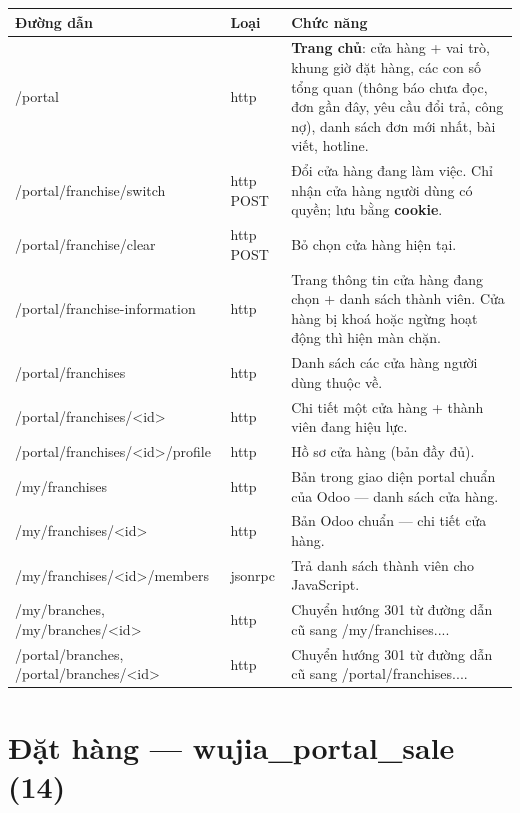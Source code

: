 \documentclass[11pt,a4paper]{report}
\newcommand{\rt}[1]{{\ttfamily\footnotesize #1}}
\begin{document}
{\small
\begin{longtable}{@{}L{5.4cm}L{1.5cm}L{7.5cm}@{}}
\toprule
\textbf{Đường dẫn} & \textbf{Loại} & \textbf{Chức năng} \\
\midrule
\endhead
\rt{/portal} & http & \textbf{Trang chủ}: cửa hàng + vai trò, khung giờ đặt hàng, các con số tổng quan (thông báo chưa đọc, đơn gần đây, yêu cầu đổi trả, công nợ), danh sách đơn mới nhất, bài viết, hotline. \\
\rt{/portal/franchise/switch} & http POST & Đổi cửa hàng đang làm việc. Chỉ nhận cửa hàng người dùng có quyền; lưu bằng \textbf{cookie}. \\
\rt{/portal/franchise/clear} & http POST & Bỏ chọn cửa hàng hiện tại. \\
\rt{/portal/franchise-information} & http & Trang thông tin cửa hàng đang chọn + danh sách thành viên. Cửa hàng bị khoá hoặc ngừng hoạt động thì hiện màn chặn. \\
\rt{/portal/franchises} & http & Danh sách các cửa hàng người dùng thuộc về. \\
\rt{/portal/franchises/<id>} & http & Chi tiết một cửa hàng + thành viên đang hiệu lực. \\
\rt{/portal/franchises/<id>/profile} & http & Hồ sơ cửa hàng (bản đầy đủ). \\
\rt{/my/franchises} & http & Bản trong giao diện portal chuẩn của Odoo — danh sách cửa hàng. \\
\rt{/my/franchises/<id>} & http & Bản Odoo chuẩn — chi tiết cửa hàng. \\
\rt{/my/franchises/<id>/members} & jsonrpc & Trả danh sách thành viên cho JavaScript. \\
\rt{/my/branches}, \rt{/my/branches/<id>} & http & Chuyển hướng 301 từ đường dẫn cũ sang \rt{/my/franchises...}. \\
\rt{/portal/branches}, \rt{/portal/branches/<id>} & http & Chuyển hướng 301 từ đường dẫn cũ sang \rt{/portal/franchises...}. \\
\bottomrule
\end{longtable}}

\section{Đặt hàng --- \rt{wujia\_portal\_sale} (14)}
\end{document}
